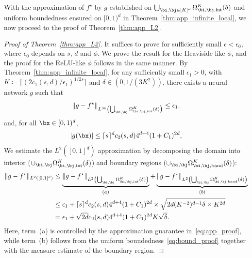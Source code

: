 \documentclass[11pt]{article}
\begin{document}
With the approximation of $f^{\star}$ by $g$ established on $\bigcup_{\bi,\bj\in[K]^d}\Omega^K_{\bi,\bj,\mathrm{int}}(\delta)$ and uniform boundedness ensured on $[0,1)^d$ in Theorem~\ref{thm:app_infinite_local}, we now proceed to the proof of Theorem~\ref{thm:app_L2}.
\begin{proof}[Proof of Theorem~\ref{thm:app_L2}]
    It suffices to prove for sufficiently small $\epsilon < {\epsilon}_{0}$, where $\epsilon_0$ depends on $s$, $d$ and $\phi$. 
    We prove the result for the Heaviside-like $\phi$, and the proof for the ReLU-like $\phi$ follows in the same manner. By Theorem~\ref{thm:app_infinite_local}, for any sufficiently small $\epsilon_1>0$, with $K \coloneqq  \lceil (2 c_1(s,d)/\epsilon_1)^{1/2s} \rceil$ and $\delta \in (0,1/(3K^2))$, there exists a neural network $g$ such that
     \begin{equation}
         \|g - f^{\star}\|_{L^\infty\left(\bigcup_{\bi,\bj} \Omega^K_{\bi, \bj, \mathrm{int}}(\delta)\right)} \le \epsilon_1.
         \label{eq:app_proof}
     \end{equation}
     and, for all $\bx\in[0,1)^d$,
     \begin{equation*}
         |g(\bx)| \leq \lceil s\rceil^d c_2(s,d) 4^{d+4}(1+C_1)^{2d}, 
         \label{eq:bound_proof}
     \end{equation*}
     We estimate the $L^2([0,1]^d)$ approximation  by decomposing the domain into interior ($\cup_{\bi,\bj} \Omega_{\bi,\bj, \mathrm{int}}^K(\delta)$) and boundary regions ($\cup_{\bi,\bj} \Omega_{\bi,\bj, \mathrm{band}}^K(\delta)$):
     \begin{equation*}
         \begin{aligned}
             \|g - f^{\star}\|_{L^2([0,1]^d)} &\leq \underbrace{ \|g - f^{\star}\|_{L^2\left(\bigcup_{\bi,\bj} \Omega^K_{\bi, \bj, \mathrm{int}}(\delta)\right)}}_{(a)} 
             +   \underbrace{\|g - f^{\star}\|_{L^2\left(\bigcup_{\bi,\bj} \Omega^K_{\bi, \bj, \mathrm{band}}(\delta)\right)}}_{(b)}
              \\
             & 
             \leq \epsilon_1 +   \lceil s\rceil^d c_2(s,d)  4^{d+4}(1+C_1)^{2d} \times \sqrt{2d (K^{-2})^{d-1} \delta \times K^{2d}} \\
             & = \epsilon_1 + \sqrt{2d}  c_2(s,d) 4^{d+4}(1+C_1)^{2d} K\sqrt{\delta} .
         \end{aligned}
     \end{equation*}
     Here, term~(a) is controlled by the approximation guarantee in~\eqref{eq:app_proof}, while term~(b) follows from the uniform boundedness~\eqref{eq:bound_proof} together with the measure estimate of the boundary region.
    

\end{proof}
\end{document}
